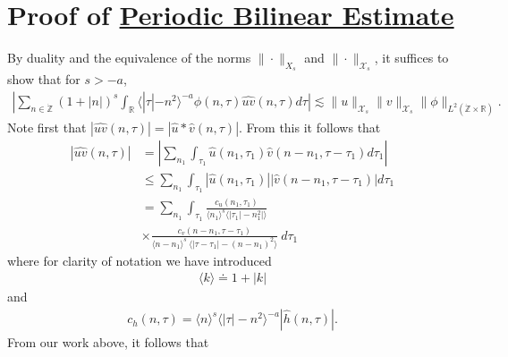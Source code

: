 \documentclass[12pt,reqno]{amsart}
\numberwithin{equation}{section}  %
\newcommand{\rr}{\mathbb{R}}
\newcommand{\zz}{\mathbb{Z}}
\newcommand{\zzdot}{\dot{\zz}}
\newcommand{\wh}{\widehat}
\begin{document}
\section{Proof of \hyperref[prop:bilinear-est]{Periodic Bilinear Estimate}} 
\label{sec:proof-bilin-est}
By duality and the equivalence of the norms $\| \cdot \|_{X_{s}}$ and $\| \cdot \|_{\mathcal{X}_{s}}$, it suffices to show that for $s > -a$, 
%
\begin{equation}
	\label{duality-est}
	\begin{split}
	|	\sum_{n \in \zzdot}  (1 + |n|)^{s}
	\int_{\rr} \langle | \tau | - n^{2}  \rangle ^{-a}\phi(n, \tau) \wh{uv}(n, \tau) d \tau | \lesssim \|u\|_{\mathcal{X}_{s}}
    \|v\|_{\mathcal{X}_{s}}
    \|\phi \|_{L^{2}(\zzdot \times \rr)}.
	\end{split}
\end{equation}
Note first that $|\wh{uv}(n, \tau) |  = | \wh{u} *  \wh{v} 
(n, \tau)|$. From this it follows that
%
%
\begin{equation}
	\label{non-lin-rep}
	\begin{split}
		| \wh{uv}(n, \tau)|
    & = | \sum_{n_{1}}  \int_{\tau_{1}}
    \wh{u}\left( n_1,  \tau_1 \right) \wh{v}\left( n - n_1 , \tau - \tau_1   
\right) d \tau_1 |
\\
& \le  \sum_{n_{1}}  \int_{\tau_{1}}
    |\wh{u}\left( n_1,  \tau_1 \right)| |\wh{v}\left( n - n_1 , \tau - \tau_1   
\right)| d \tau_1 
\\
& = \sum_{n_{1}} \int_{\tau_{1}} \frac{c_u\left( n_1, \tau_1 
\right)}{\langle n_1 \rangle ^s \langle |\tau_1| - n_1^{2} | \rangle }
\\
& \times \frac{c_{v}\left( n - n_1, \tau - \tau_1 \right)}{\langle n -
n_1 \rangle ^s\ \langle |\tau - \tau_1 | -  (n - n_1)^{2} \rangle}
  \ d \tau_1 
\end{split}
\end{equation}
%
%
where for clarity of notation we have introduced 
%
%
%
\begin{equation*}
\begin{split}
\langle k \rangle \doteq 1 + |k|
\end{split}
\end{equation*}
%
%
and
%
\begin{equation*}
	\begin{split}
		c_h(n, \tau) =
		\langle n \rangle ^s \langle |\tau| - n^{2} \rangle^{-a} | \wh{h}\left( n, \tau \right) |.
	\end{split}
\end{equation*}
%
%
From our work above, it follows that 
\end{document}
